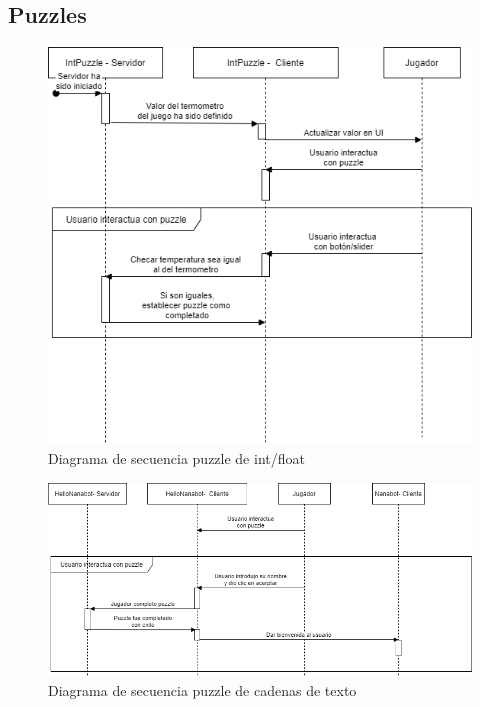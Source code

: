 \subsection{Puzzles}
    \begin{figure}[H]
        \centering
        \includegraphics[width=0.8\linewidth]{images/DiagramaSecuenciaPuzzleNumbers.png}
        \caption{Diagrama de secuencia puzzle de int/float}
        \label{fig:diagrama_sec_int_float}
    \end{figure}
        \begin{figure}[H]
        \centering
        \includegraphics[width=0.8\linewidth]{images/DiagramaSecuenciaPuzzleString.png}
        \caption{Diagrama de secuencia puzzle de cadenas de texto}
        \label{fig:diagrama_sec_string}
    \end{figure}
